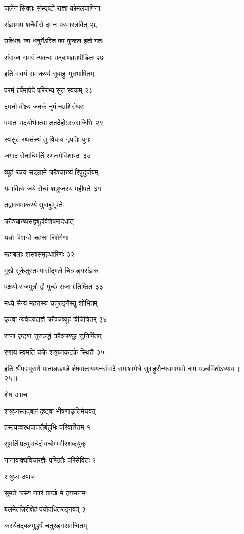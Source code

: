 जलेन सिक्तः संस्पृष्टो राज्ञा कोमलपाणिना

संज्ञामाप शनैर्वीरो दमनः परमास्त्रवित् २६

उत्थितः क्व धनुर्मेऽस्ति क्व पुष्कल इतो गतः

संसज्य समरं त्यक्त्वा मद्बाणव्रणपीडितः २७

इति वाक्यं समाकर्ण्य सुबाहुः पुत्रभाषितम्

परमं हर्षमापेदे परिरभ्य सुतं स्वकम् २८

दमनो वीक्ष्य जनकं नृपं नम्रशिरोधरः

पपात पादयोर्भक्त्या क्षतदेहोऽस्त्रराजिभिः २९

स्वसुतं रथसंस्थं तु विधाय नृपतिः पुनः

जगाद सेनाधिपतिं रणकर्मविशारदः ३०

व्यूहं रचय सङ्ग्रामे क्रौञ्चाख्यं रिपुदुर्जयम्

यमाविश्य जये सैन्यं शत्रुघ्नस्य महीपतेः ३१

तद्वाक्यमाकर्ण्य सुबाहुभूपतेः

क्रौञ्चाख्यसद्व्यूहविशेषमादधात्

यन्नो विशन्ते सहसा रिपोर्गणा

महाबलाः शस्त्रसमूहधारिणः ३२

मुखे सुकेतुस्तस्यासीद्गले चित्राङ्गसंज्ञकः

पक्षयो राजपुत्रौ द्वौ पुच्छे राजा प्रतिष्ठितः ३३

मध्ये सैन्यं महत्तस्य चतुरङ्गैस्तु शोभितम्

कृत्वा न्यवेदयद्राज्ञे क्रौञ्चव्यूहं विचित्रितम् ३४

राजा दृष्ट्वा सुसन्नद्धं क्रौञ्चव्यूहं सुनिर्मितम्

रणाय स्वमतिं चक्रे शत्रुघ्नकटके स्थितैः ३५

इति श्रीपद्मपुराणे पातालखण्डे शेषवात्स्यायनसंवादे रामाश्वमेधे सुबाहुसैन्यसमागमो नाम पञ्चविंशोऽध्यायः॥२५॥


शेष उवाच

शत्रुघ्नस्तद्बलं दृष्ट्वा भीषणाकृतिमेघवत्

हस्त्यश्वरथपादातैर्बहुभिः परिवारितम् १

सुमतिं प्रत्युवाचेदं वचोगम्भीरशब्दयुक्

नानावाक्यविचारज्ञैः पण्डितैः परिसेवितः २

शत्रुघ्न उवाच

सुमते कस्य नगरं प्राप्तो मे हयसत्तमः

बलमेतन्निरीक्षेहं पयोदधितरङ्गवत् ३

कस्यैतद्बलमुद्धर्षं चतुरङ्गसमन्वितम्

